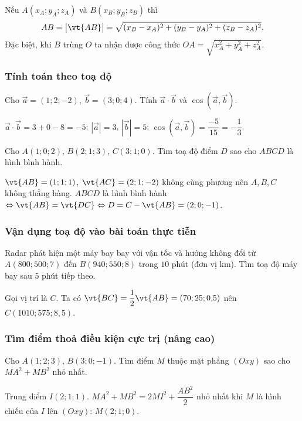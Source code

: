 \begin{chuy}
Nếu $A(x_A;y_A;z_A)$ và $B(x_B;y_B;z_B)$ thì
\[AB=\big|\vt{AB}\big|=\sqrt{(x_B-x_A)^2+(y_B-y_A)^2+(z_B-z_A)^2}.\]
Đặc biệt, khi $B$ trùng $O$ ta nhận được công thức $OA=\sqrt{x_A^2+y_A^2+z_A^2}$.
\end{chuy}

\viduminhhoa
\subsubsection{Tính toán theo toạ độ}
\begin{vidu}
Cho $\vec a=(1;2;-2)$, $\vec b=(3;0;4)$. Tính $\vec a\cdot\vec b$ và $\cos(\vec a,\vec b)$.
\begin{loigiai}
\giai $\vec a\cdot\vec b=3+0-8=-5$; $|\vec a|=3$, $|\vec b|=5$; $\cos(\vec a,\vec b)=\dfrac{-5}{15}=-\dfrac13$.
\end{loigiai}
\end{vidu}
\begin{vidu}
Cho $A(1;0;2)$, $B(2;1;3)$, $C(3;1;0)$. Tìm toạ độ điểm $D$ sao cho $ABCD$ là hình bình hành.
\begin{loigiai}
\giai $\vt{AB}=(1;1;1)$, $\vt{AC}=(2;1;-2)$ không cùng phương nên $A,B,C$ không thẳng hàng. $ABCD$ là hình bình hành $\Leftrightarrow\vt{AB}=\vt{DC}\Leftrightarrow D=C-\vt{AB}=(2;0;-1)$.
\end{loigiai}
\end{vidu}
\subsubsection{Vận dụng toạ độ vào bài toán thực tiễn}
\begin{vidu}
Radar phát hiện một máy bay bay với vận tốc và hướng không đổi từ $A(800;500;7)$ đến $B(940;550;8)$ trong $10$ phút (đơn vị km). Tìm toạ độ máy bay sau $5$ phút tiếp theo.
\begin{loigiai}
\giai Gọi vị trí là $C$. Ta có $\vt{BC}=\dfrac12\vt{AB}=(70;25;0{,}5)$ nên $C(1010;575;8{,}5)$.
\end{loigiai}
\end{vidu}
\subsubsection{Tìm điểm thoả điều kiện cực trị (nâng cao)}
\begin{vidu}
Cho $A(1;2;3)$, $B(3;0;-1)$. Tìm điểm $M$ thuộc mặt phẳng $(Oxy)$ sao cho $MA^2+MB^2$ nhỏ nhất.
\begin{loigiai}
\giai Trung điểm $I(2;1;1)$. $MA^2+MB^2=2MI^2+\dfrac{AB^2}{2}$ nhỏ nhất khi $M$ là hình chiếu của $I$ lên $(Oxy)$: $M(2;1;0)$.
\end{loigiai}
\end{vidu}

